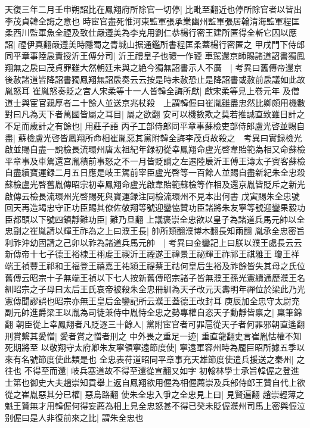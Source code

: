 天復三年二月壬申朔詔比在鳳翔府所除官一切停|{
	比毗至翻近也停所除官者以皆出李茂貞韓全誨之意也}
時宦官盡死惟河東監軍張承業幽州監軍張居翰清海監軍程匡柔西川監軍魚全禋及致仕嚴遵美為李克用劉仁恭楊行密王建所匿得全斬它囚以應詔|{
	禋伊真翻嚴遵美時隱蜀之青城山据通鑑所書程匡柔蓋楊行密匿之}
甲戌門下侍郎同平章事陸扆責授沂王傅分司|{
	沂王禮皇子也禮一作禋}
車駕還京師賜諸道詔書獨鳳翔無之扆曰茂貞罪雖大然朝廷未與之絶今獨無詔書示人不廣　|{
	考異曰舊傳帝還京後赦諸道皆降詔書獨鳳翔無詔扆奏云云按是時未赦恐止是降詔書或赦前扆議如此故胤怒耳}
崔胤怒奏貶之宫人宋柔等十一人皆韓全誨所獻|{
	獻宋柔等見上卷元年}
及僧道士與宦官親厚者二十餘人並送京兆杖殺　上謂韓偓曰崔胤雖盡忠然比卿頗用機數對曰凡為天下者萬國皆屬之耳目|{
	屬之欲翻}
安可以機數欺之莫若推誠直致雖日計之不足而歲計之有餘也|{
	用莊子語}
丙子工部侍郎同平章事蘇檢吏部侍郎盧光啓並賜自盡|{
	蘇檢盧光啓皆鳳翔所命相崔胤惡其黨附韓全誨李茂貞故殺之　考異曰實録檢光啟並賜自盡一說檢長流環州唐太祖紀年録初從幸鳳翔命盧光啓韋貽範為相又命蘇檢平章事及車駕還宫胤積前事怒之不一月皆貶謫之左遷陸扆沂王傅王漙太子賓客蘇檢自盡續寶運録二月五日應是岐王駕前宰臣盧光啓等一百餘人並賜自盡新紀朱全忠殺蘇檢盧光啓舊胤傳昭宗初幸鳳翔命盧光啟韋貽範蘇檢等作相及還京胤皆貶斥之新光啟傳云檢長流環州光啓賜死與寶運録注同檢流環州不見本出何書}
戊寅賜朱全忠號回天再造竭忠守正功臣賜其僚佐敬翔等號迎鑾恊贊功臣諸將朱友寧等號迎鑾果毅功臣都頭以下號四鎮靜難功臣|{
	難乃旦翻}
上議褒崇全忠欲以皇子為諸道兵馬元帥以全忠副之崔胤請以輝王祚為之上曰濮王長|{
	帥所類翻濮博木翻長知兩翻}
胤承全忠密旨利祚沖幼固請之己卯以祚為諸道兵馬元帥　|{
	考異曰金鑾記上曰朕以濮王處長云云新傳帝十七子德王裕棣王祤䖍王禊沂王禋遂王禕景王祕輝王祚祁王祺雅王瓊王祥端王禎豐王祁和王福登王禧嘉王祐潁王禔蔡王祜何皇后生裕及祚餘皆失其母之氏位舊傳云昭宗十子無端王禎以下七人按新舊傳昭宗諸子皆無濮王孫光憲續通歷濮王名紃昭宗之子母曰太后王氏哀帝被殺朱全忠冊紃為天子改元天夀明年禪位於梁此乃光憲傳聞謬誤也昭宗亦無王皇后金鑾記所云濮王蓋德王改封耳}
庚辰加全忠守太尉充副元帥進爵梁王以胤為司徒兼侍中胤恃全忠之勢專權自恣天子動靜皆禀之|{
	稟筆錦翻}
朝臣從上幸鳳翔者凡貶逐三十餘人|{
	黨附宦官者可罪扈從天子者何罪邪朝直遙翻}
刑賞繫其愛憎|{
	愛者賞之憎者刑之}
中外畏之重足一迹|{
	重直龍翻史言崔胤怙權不知死期將至}
以敬翔守太府卿朱友寧領寧遠節度使|{
	寧遠軍容州時為龎巨昭所據五季以來有名號節度使此類是也}
全忠表苻道昭同平章事充天雄節度使遣兵援送之秦州|{
	之往也}
不得至而還|{
	岐兵塞道故不得至還從宣翻又如字}
初翰林學士承旨韓偓之登進士第也御史大夫趙崇知貢舉上返自鳳翔欲用偓為相偓薦崇及兵部侍郎王贊自代上欲從之崔胤惡其分已權|{
	惡烏路翻}
使朱全忠入爭之全忠見上曰|{
	見賢遍翻}
趙崇輕薄之魁王贊無才用韓偓何得妄薦為相上見全忠怒甚不得已癸未貶偓濮州司馬上密與偓泣别偓曰是人非復前來之比|{
	謂朱全忠也}
